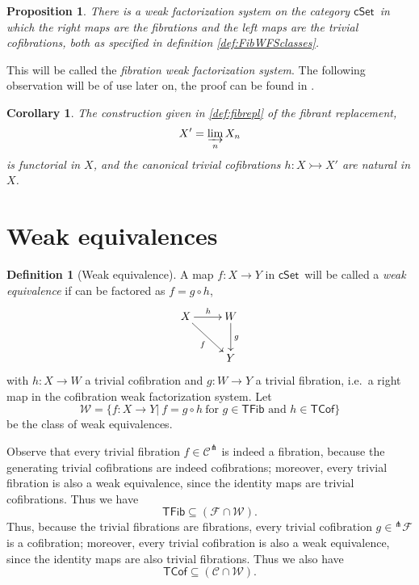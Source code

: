 \documentclass[12pt]{article}
\newcommand{\cSet}{\ensuremath{\mathsf{cSet}}}
\newcommand{\mono}{\ensuremath{\rightarrowtail}}
\newcommand{\ra}{\ensuremath{\rightarrow}}
\newtheorem{proposition}[theorem]{Proposition}
\newtheorem{corollary}[theorem]{Corollary}
\theoremstyle{remark}
\theoremstyle{definition}
\newtheorem{definition}[theorem]{Definition}
\begin{document}
\begin{proposition}
There is a weak factorization system on the category \cSet\ in which the right maps are the fibrations and the left maps are the trivial cofibrations, both as specified in definition \ref{def:FibWFSclasses}.
\end{proposition}

This will be called the \emph{fibration weak factorization system}.
The following observation will be of use later on, the proof can be found in \cite{Garner, Awodey}.

\begin{corollary}
The  construction given in \eqref{def:fibrepl} of the \emph{fibrant replacement}, $$X' = \varinjlim_n X_n$$ is functorial in $X$, and the canonical trivial cofibrations $h:X\mono X'$ are natural in $X$.  
\end{corollary}

\section{Weak equivalences}

\begin{definition}[Weak equivalence]
A map $f: X\ra Y$ in \cSet\ will be called a \emph{weak equivalence} if can be factored as $f  = g\circ h$,
\begin{equation*}%
\xymatrix{
X \ar[rd]_{f} \ar[r]^h & W\ar[d]^g\\
& Y
}
\end{equation*}
with $h: X\ra W$ a trivial cofibration and $g: W\ra Y$ a trivial fibration, i.e.\ a right map in the cofibration weak factorization system. Let 
\[
\mathcal{W} = \{f: X\ra Y |\ f = g\circ h\ \text{for $g\in\mathsf{TFib}$ and $h\in\mathsf{TCof}$} \}
\]
 be the class of weak equivalences.
\end{definition}

Observe that every trivial fibration $f\in\mathcal{C}^\pitchfork$ is indeed a fibration, because the generating trivial cofibrations are indeed cofibrations; moreover, every trivial fibration is also a weak equivalence, since the identity maps are trivial cofibrations.  Thus we have
\[
\mathsf{TFib} \subseteq (\mathcal{F} \cap \mathcal{W}).
\]
Thus, because the trivial fibrations are fibrations, every trivial cofibration $g\in{^{\pitchfork}\mathcal{F}}$ is a cofibration; moreover, every trivial cofibration is also a weak equivalence, since the identity maps are also trivial fibrations.  Thus we also have
\[
\mathsf{TCof} \subseteq (\mathcal{C} \cap \mathcal{W}).
\]
\end{document}
